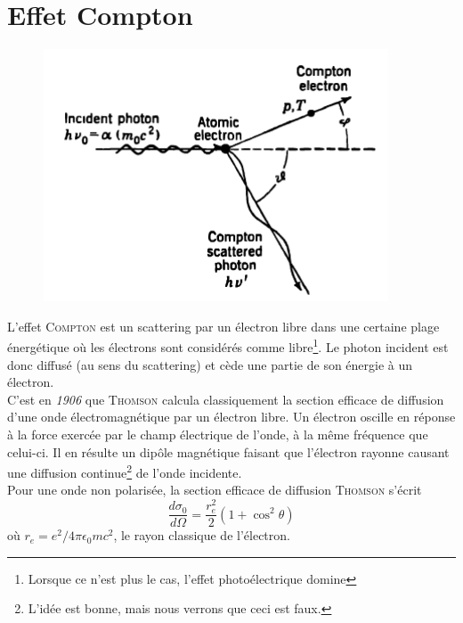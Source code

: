 \section{Effet Compton}%
	\begin{figure}
	\vspace{-10mm}
	\includegraphics[scale=0.4]{ch4/image2}
	\end{figure}
L'effet \textsc{Compton} est un scattering par un électron libre dans une certaine plage énergétique
où les électrons sont considérés comme libre\footnote{Lorsque ce n'est plus le cas, l'effet 
photoélectrique domine}. Le photon incident est donc diffusé (au sens du scattering) et cède une 
partie de son énergie à un électron.\\

C'est en \textit{1906} que \textsc{Thomson} calcula classiquement la section efficace de diffusion
d'une onde électromagnétique par un électron libre. Un électron oscille en réponse à la force
exercée par le champ électrique de l'onde, à la même fréquence que celui-ci. Il en résulte un 
dipôle magnétique faisant que l'électron rayonne causant une diffusion continue\footnote{L'idée 
est bonne, mais nous verrons que ceci est faux.} de l'onde incidente.\\

Pour une onde non polarisée, la section efficace de diffusion \textsc{Thomson} s'écrit
\begin{equation}
\frac{d\sigma_0}{d\Omega}=\frac{r_e^2}{2}(1+\cos^2\theta)
\end{equation}
où $r_e = e^2/4\pi\epsilon_0mc^2$, le rayon classique de l'électron. 

	
